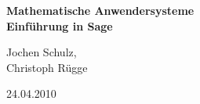 \usepackage[psamsfonts]{amssymb}
\usepackage{amsmath}
\usepackage[svgnames]{xcolor} %




\parindent0cm %



\newenvironment{aufg}[1]
{\begin{samepage}%
\colorbox{light-gray}{%
 \makebox[\textwidth]{%
\textbf{Aufgabe \arabic{zaehler} } }\hspace{-\textwidth}\makebox[\textwidth]{\hfill #1 Punkte} }\\[0.05cm]       %
\begin{minipage}{\textwidth}}
{\end{minipage} \nopagebreak %
\\ 
\stepcounter{zaehler}                           %
 \end{samepage}%
}



\begin{center}
\textbf{\LARGE Mathematische Anwendersysteme }\\
\textbf{\LARGE Einführung in Sage}\\\medskip
\end{center}
\begin{minipage}{6cm}
Jochen Schulz,\\
Christoph Rügge
\end{minipage}\hfill
\begin{minipage}{4cm}
24.04.2010
\end{minipage}\\[1cm]

